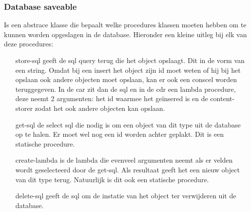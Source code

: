 \documentclass{article}
\begin{document}
\subsubsection{Database saveable}
\label{ssub:db-saveable}
Is een abstrace klasse die bepaalt welke procedures klassen moeten hebben om te kunnen worden opgeslagen in de database. Hieronder een kleine uitleg bij elk van deze procedures:
\begin{itemize}
		\item[store-sql] geeft de sql query terug die het object opslaagt. Dit in de vorm van een string. Omdat bij een insert het object zijn id moet weten of hij bij het opslaan ook andere objecten moet opslaan, kan er ook een conscel worden teruggegeven. In de car zit dan de sql en in de cdr een lambda procedure, deze neemt 2 argumenten: het id waarmee het ge\"insered is en de content-storer zodat het ook andere objecten kan opslaan.
		\item[get-sql] de select sql die nodig is om een object van dit type uit de database op te halen. Er moet wel nog een id worden achter geplakt. Dit is een statische procedure.
		\item[create-lambda] is de lambda die evenveel argumenten neemt als er velden wordt geselecteerd door de get-sql. Als resultaat geeft het een nieuw object van dit type terug. Natuurlijk is dit ook een statische procedure.
		\item[delete-sql] geeft de sql om de instatie van het object ter verwijderen uit de database.
\end{itemize}
\end{document}
